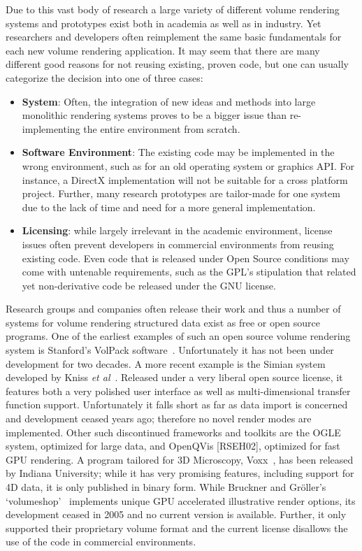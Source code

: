 Due to this vast body of research a large variety of different volume
rendering systems and prototypes exist both in academia as well as
in industry. Yet researchers and developers often reimplement the
same basic fundamentals for each new volume rendering application. It
may seem that there are many different good reasons for not reusing
existing, proven code, but one can usually categorize the decision into
one of three cases:

\begin{itemize}

  \item \textbf{System}:
	Often, the integration of new ideas and methods
	into large monolithic rendering systems proves to be a
	bigger issue than re-implementing the entire environment
	from scratch.

  \item \textbf{Software Environment}: The existing code may be
  implemented in the wrong environment, such as for an old operating
  system or graphics API. For instance, a DirectX implementation will
  not be suitable for a cross platform project. Further, many research
  prototypes are tailor-made for one system due to the lack of time and
  need for a more general implementation.

  \item \textbf{Licensing}: while largely irrelevant in the academic
  environment, license issues often prevent developers in commercial
  environments from reusing existing code. Even code that is released
  under Open Source conditions may come with untenable requirements,
  such as the GPL's stipulation that related yet non-derivative code be
  released under the GNU license.

\end{itemize}

Research groups and companies often release their work and thus a
number of systems for volume rendering structured data exist as free
or open source programs. One of the earliest examples of such an
open source volume rendering system is Stanford's VolPack
software~\cite{VolPack}.  Unfortunately it has not been under
development for two decades. A more recent example is the Simian system
developed
by Kniss \textit{et al}~\cite{Simian}. Released under a very liberal
open source license, it features both a very polished user interface as
well as multi-dimensional transfer function support. Unfortunately it
falls short as far as data import is concerned and development ceased
years ago; therefore no novel render modes are implemented. Other such
discontinued frameworks and toolkits are the OGLE~\cite{OGLE} system,
optimized for large data, and OpenQVis [RSEH02], optimized for fast GPU
rendering. A program tailored for 3D Microscopy,
Voxx~\cite{Indiana:2009:Voxx}, has been released by Indiana University;
while it has very promising features, including support for 4D data,
it is only published in binary form.  While Bruckner and Gr\"oller's
`volumeshop'~\cite{Bruckner:2005:VolumeShop} implements unique GPU
accelerated illustrative render options, its development ceased in 2005
and no current version is available. Further, it only supported their
proprietary volume format and the current license disallows the use of
the code in commercial environments.

